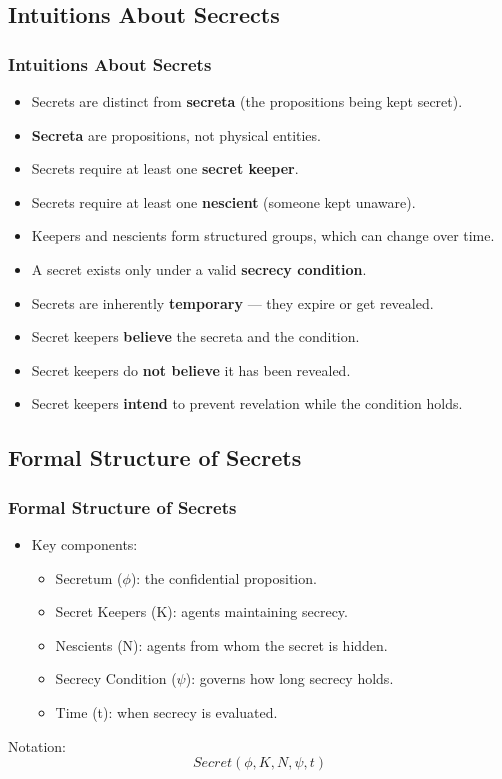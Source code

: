 \documentclass[aspectratio=169]{beamer}
\begin{document}
\subsection{Intuitions About Secrects}
\begin{frame}
\frametitle{Intuitions About Secrets}
\begin{itemize}
    \item Secrets are distinct from \textbf{secreta} (the propositions being kept secret).
    \item \textbf{Secreta} are propositions, not physical entities.
    \item Secrets require at least one \textbf{secret keeper}.
    \item Secrets require at least one \textbf{nescient} (someone kept unaware).
    \item Keepers and nescients form structured groups, which can change over time.
    \item A secret exists only under a valid \textbf{secrecy condition}.
    \item Secrets are inherently \textbf{temporary} — they expire or get revealed.
    \item Secret keepers \textbf{believe} the secreta and the condition.
    \item Secret keepers do \textbf{not believe} it has been revealed.
    \item Secret keepers \textbf{intend} to prevent revelation while the condition holds.
\end{itemize}
\end{frame}

\subsection{Formal Structure of Secrets}
\begin{frame}
\frametitle{Formal Structure of Secrets}
{\Large
\begin{itemize}
    \item Key components:
    \begin{itemize}
        \Large 
        \item Secretum ($\phi$): the confidential proposition.
        \item Secret Keepers (K): agents maintaining secrecy.
        \item Nescients (N): agents from whom the secret is hidden.
        \item Secrecy Condition ($\psi$): governs how long secrecy holds.
        \item Time (t): when secrecy is evaluated.
    \end{itemize}
\end{itemize}
}
{\normalsize
\begin{block}{Notation:}
\[
Secret(\phi, K, N, \psi, t)
\]
\end{block}
}
\end{frame}
\end{document}
